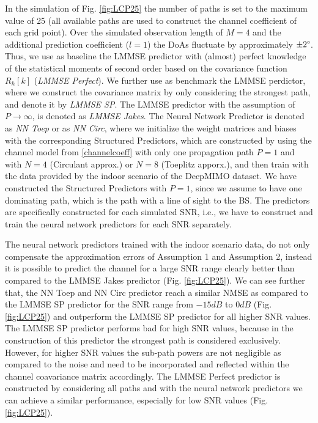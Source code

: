 \documentclass[12pt, draftclsnofoot, onecolumn]{IEEEtran}
\begin{document}
In the simulation of Fig. \ref{fig:LCP25} the number of paths is set to the maximum value of 25 (all available paths are used to construct the channel coefficient of each grid point). Over the simulated observation length of $M=4$ and the additional prediction coefficient ($l=1$) the DoAs fluctuate by approximately $\pm 2 \degree$. Thus, we use as baseline the LMMSE predictor with (almost) perfect knowledge of the statistical moments of second order based on the covariance function $ R_h[k]$ (\textit{LMMSE Perfect}). We further use as benchmark the LMMSE perdictor, where we construct the covariance matrix by only considering the strongest path, and denote it by \textit{LMMSE SP}. The LMMSE predictor with the assumption of $P \to \infty$, is denoted as \textit{LMMSE Jakes}. The Neural Network Predictor is denoted as \textit{NN Toep} or as \textit{NN Circ}, where we initialize the weight matrices and biases with the corresponding Structured Predictors, which are constructed by using the channel model from \eqref{channelcoeff} with only one propagation path $P=1$ and with $N=4$ (Circulant approx.) or $N=8$ (Toeplitz apporx.), and then train with the data provided by the indoor scenario of the DeepMIMO dataset. We have constructed the Structured Predictors with $P=1$, since we assume to have one dominating path, which is the path with a line of sight to the BS. The predictors are specifically constructed for each simulated SNR, i.e., we have to construct and train the neural network predictors for each SNR separately.

The neural network predictors trained with the indoor scenario data, do not only compensate the approximation errors of Assumption 1 and Assumption 2, instead it is possible to predict the channel for a large SNR range clearly better than compared to the LMMSE Jakes predictor (Fig. \ref{fig:LCP25}). We can see further that, the NN Toep and NN Circ predictor reach a similar NMSE as compared to the LMMSE SP predictor for the SNR range from $-15\si{dB}$ to $0\si{dB}$ (Fig. \ref{fig:LCP25}) and outperform the LMMSE SP predictor for all higher SNR values. The LMMSE SP predictor performs bad for high SNR values, because in the construction of this predictor the strongest path is considered exclusively. However, for higher SNR values the sub-path powers are not negligible as compared to the noise and need to be incorporated and reflected within the channel coavariance matrix accordingly. The LMMSE Perfect predictor is constructed by considering all paths and with the neural network predictors we can achieve a similar performance, especially for low SNR values (Fig. \ref{fig:LCP25}).
\end{document}
